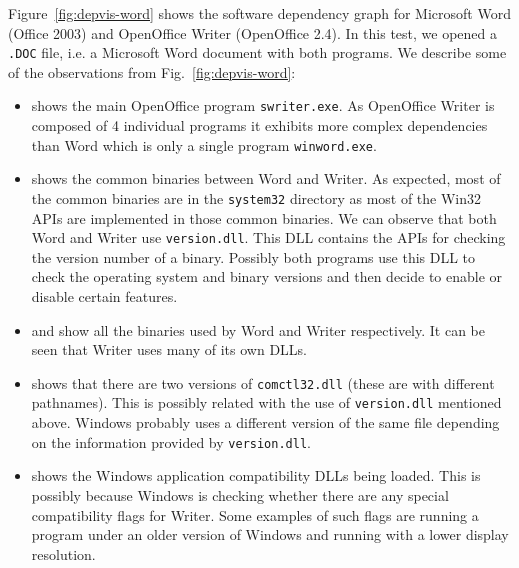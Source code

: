 Figure~\ref{fig:depvis-word} shows the software dependency graph for Microsoft Word
(Office 2003) and OpenOffice Writer (OpenOffice 2.4).
In this test, we opened a {\tt .DOC} file, i.e. a Microsoft Word document
with both programs.
We describe some of the observations from Fig.~\ref{fig:depvis-word}:

\begin{itemize}

\item {} shows the main OpenOffice program
\texttt{swriter.exe}.
As OpenOffice Writer is composed of 4 individual programs it
exhibits more complex dependencies than
Word which is only a single program \texttt{winword.exe}.

\item {} shows the common binaries between Word and Writer.
As expected, most of the common binaries
are in the \texttt{system32} directory as
most of the Win32 APIs are implemented in those common binaries.
We can observe that both Word and Writer use \texttt{version.dll}.
This DLL contains the APIs for checking the version number of a binary.
Possibly both programs use this DLL to check the operating system and
binary versions and then decide to enable or disable certain features.

\item {} and  show all the binaries
used by Word and Writer respectively. It can be seen that Writer
uses many of its own DLLs.

\item {} shows that there are two
versions of \texttt{comctl32.dll}
(these are with different pathnames). This is possibly related
with the use of \texttt{version.dll} mentioned above.
Windows probably uses a different version of the
same file depending on the information provided by \texttt{version.dll}.

\item {} shows the Windows application
compatibility DLLs being loaded.
This is possibly because Windows is checking whether there are any special
compatibility flags for Writer.
Some examples of such flags are running a program under an older version of
Windows and running with a lower display resolution.

\end{itemize}

